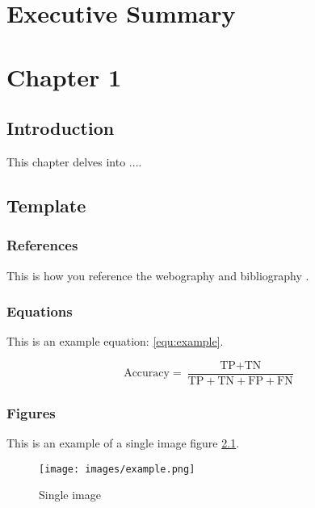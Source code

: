 \chapter{Executive Summary}
\label{chap:execsummary}


\chapter{Chapter 1}
\minitoc
\label{chap:1st}
\section*{Introduction}
    This chapter delves into ....

\section{Template}
    \subsection{References}
        This is how you reference the webography \cite{web:melek} and bibliography \cite{ref:example}.
        
    \subsection{Equations}
        This is an example equation: \ref{equ:example}.

       \begin{equation}
            \text{Accuracy} = \frac{\text{TP} + \text{TN}}{\text{TP} + \text{TN} + \text{FP} + \text{FN}}
            \label{equ:example}
        \end{equation}


        

        
    \subsection{Figures}
        This is an example of a single image figure \ref{img:single}.

        \begin{figure}[htbp]
        \centerline{\texttt{[image: images/example.png]}}
        \caption{Single image}
        \label{img:single}   
        \end{figure}

